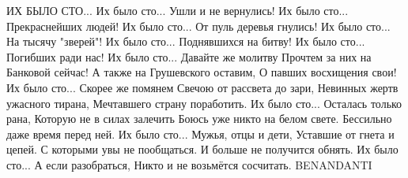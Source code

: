 \begin{itemize}
\begin{multicols}{2}
\obeycr
ИХ БЫЛО СТО...
Их было сто... Ушли и не вернулись!
Их было сто... Прекраснейших людей!
Их было сто... От пуль деревья гнулись!
Их было сто... На тысячу "зверей"!
Их было сто... Поднявшихся на битву!
Их было сто... Погибших ради нас!
Их было сто... Давайте же молитву
Прочтем за них на Банковой сейчас!
А также на Грушевского оставим,
О павших восхищения свои!
Их было сто... Скорее же помянем
Свечою от рассвета до зари,
Невинных жертв ужасного тирана,
Мечтавшего страну поработить.
Их было сто... Осталась только рана,
Которую не в силах залечить
Боюсь уже никто на белом свете.
Бессильно даже время перед ней.
Их было сто... Мужья, отцы и дети,
Уставшие от гнета и цепей.
С которыми увы не пообщаться.
И больше не получится обнять.
Их было сто... А если разобраться,
Никто и не возьмётся сосчитать.
BENANDANTI
\restorecr
\end{multicols}


\end{itemize} %
